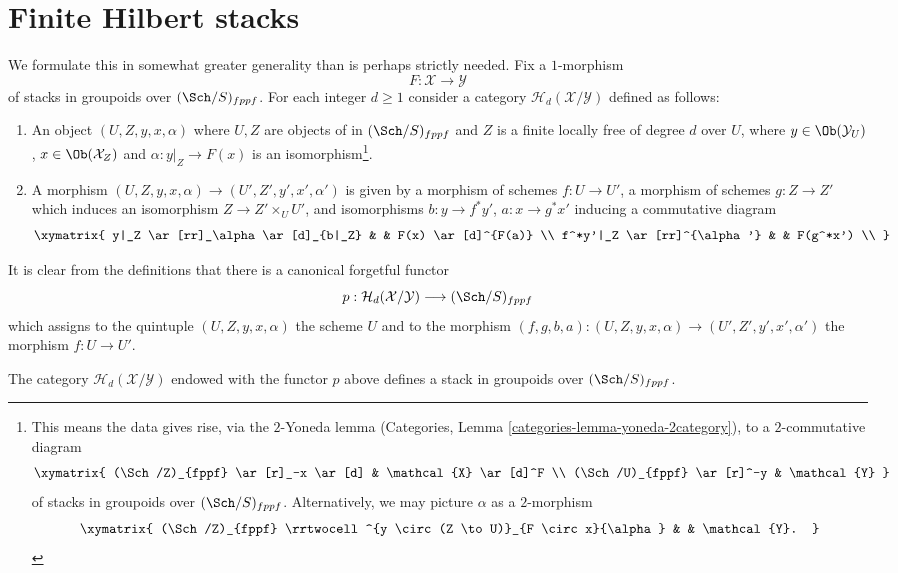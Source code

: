 \section{Finite Hilbert stacks}
\label{section-hilbert-d-stack}

\noindent
We formulate this in somewhat greater generality than is perhaps strictly
needed. Fix a $1$-morphism
$$
F : \mathcal{X} \longrightarrow \mathcal{Y}
$$
of stacks in groupoids over $(\Sch/S)_{fppf}$. For each integer
$d \geq 1$ consider a category $\mathcal{H}_d(\mathcal{X}/\mathcal{Y})$
defined as follows:
\begin{enumerate}
\item An object $(U, Z, y, x, \alpha)$ where $U, Z$ are objects of
in $(\Sch/S)_{fppf}$ and $Z$ is a finite locally free of degree
$d$ over $U$, where
$y \in \Ob(\mathcal{Y}_U)$, $x \in \Ob(\mathcal{X}_Z)$
and $\alpha : y|_Z \to F(x)$ is an isomorphism\footnote{
This means the data gives rise, via the $2$-Yoneda lemma
(Categories, Lemma \ref{categories-lemma-yoneda-2category}), to a
$2$-commutative diagram
$$
\xymatrix{
(\Sch/Z)_{fppf} \ar[r]_-x \ar[d] & \mathcal{X} \ar[d]^F \\
(\Sch/U)_{fppf} \ar[r]^-y & \mathcal{Y}
}
$$
of stacks in groupoids over $(\Sch/S)_{fppf}$.
Alternatively, we may picture $\alpha$ as a $2$-morphism
$$
\xymatrix{
(\Sch/Z)_{fppf}
\rrtwocell^{y \circ (Z \to U)}_{F \circ x}{\alpha} & &
\mathcal{Y}.
}
$$
}.
\item A morphism $(U, Z, y, x, \alpha) \to (U', Z', y', x', \alpha')$ is
given by a morphism of schemes $f : U \to U'$, a morphism of schemes
$g : Z \to Z'$ which induces an isomorphism $Z \to Z' \times_U U'$,
and isomorphisms $b : y \to f^*y'$, $a : x \to g^*x'$ inducing a commutative
diagram
$$
\xymatrix{
y|_Z \ar[rr]_\alpha \ar[d]_{b|_Z} & &
F(x) \ar[d]^{F(a)} \\
f^*y'|_Z \ar[rr]^{\alpha'} & &
F(g^*x') \\
}
$$
\end{enumerate}
It is clear from the definitions that there is a canonical
forgetful functor
$$
p :
\mathcal{H}_d(\mathcal{X}/\mathcal{Y})
\longrightarrow
(\Sch/S)_{fppf}
$$
which assigns to the quintuple $(U, Z, y, x, \alpha)$ the scheme $U$
and to the morphism
$(f, g, b, a) : (U, Z, y, x, \alpha) \to (U', Z', y', x', \alpha')$
the morphism $f : U \to U'$.

\begin{lemma}
\label{lemma-hilbert-d-stack}
The category $\mathcal{H}_d(\mathcal{X}/\mathcal{Y})$ endowed with
the functor $p$ above defines a stack in groupoids over
$(\Sch/S)_{fppf}$.
\end{lemma}

